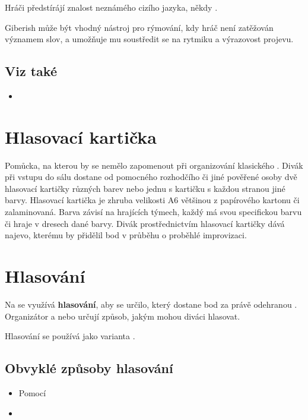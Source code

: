 \documentclass[main.tex]{subfiles}
\begin{document}
Hráči předstírájí  znalost neznámého cizího jazyka, někdy . 
 
Giberish může být vhodný nástroj pro rýmování, kdy hráč není zatěžován významem slov, a umožňuje mu soustředit se na rytmiku a výrazovost projevu. 
 
\subsection{Viz také} \begin{itemize}
\item {}
\end{itemize}
 
 
\needspace{5cm} \section{Hlasovací kartička} \label{hlasovací kartička}  
 
Pomůcka, na kterou by se nemělo zapomenout při organizování klasického . Divák při vstupu do sálu dostane od pomocného rozhodčího či jiné pověřené osoby dvě hlasovací kartičky různých barev nebo jednu s kartičku s každou stranou jiné barvy. Hlasovací kartička je zhruba velikosti A6 většinou z papírového kartonu či zalaminovaná. Barva závisí na hrajících týmech, každý  má svou specifickou barvu či hraje v dresech dané barvy. Divák prostřednictvím hlasovací kartičky dává najevo, kterému  by přidělil bod v průběhu  o proběhlé improvizaci. 
 
 
\needspace{5cm} \section{Hlasování} \label{hlasování} Na  se využívá \textbf{hlasování}{}, aby se určilo, který  dostane bod za právě odehranou . Organizátor a nebo  určují způsob, jakým mohou diváci hlasovat. 
 
Hlasování se používá jako varianta . 
 
\subsection{ Obvyklé způsoby hlasování } \begin{itemize}
\item  Pomocí 
\item  {}
\end{itemize}
 
\end{document}
